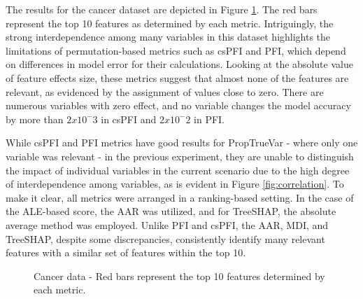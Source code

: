 The results for the cancer dataset are depicted in Figure \ref{fig:cancer}. The red bars represent the top 10 features as determined by each metric. Intriguingly, the strong interdependence among many variables in this dataset highlights the limitations of permutation-based metrics such as \gls{csPFI} and \gls{PFI}, which depend on differences in model error for their calculations. Looking at the absolute value of feature effects size, these metrics suggest that almost none of the features are relevant, as evidenced by the assignment of values close to zero. There are numerous variables with zero effect, and no variable changes the model accuracy by more than \(2 x 10^-3\) in \gls{csPFI} and \(2 x 10^-2\) in \gls{PFI}. 

While \gls{csPFI} and \gls{PFI} metrics have good results for PropTrueVar - where only one variable was relevant -  in the previous experiment, they are unable to distinguish the impact of individual variables in the current scenario due to the high degree of interdependence among variables, as is evident in Figure \ref{fig:correlation}. To make it clear, all metrics were arranged in a ranking-based setting. In the case of the ALE-based score, the AAR was utilized, and for TreeSHAP, the absolute average method was employed. Unlike \gls{PFI} and \gls{csPFI}, the \gls{AAR}, \gls{MDI}, and TreeSHAP, despite some discrepancies, consistently identify many relevant features with a similar set of features within the top 10.

\begin{figure}[ht!]
\centering
  \caption{Cancer data - Red bars represent the top 10 features determined by each metric.}
    \label{fig:cancer}
\end{figure}

